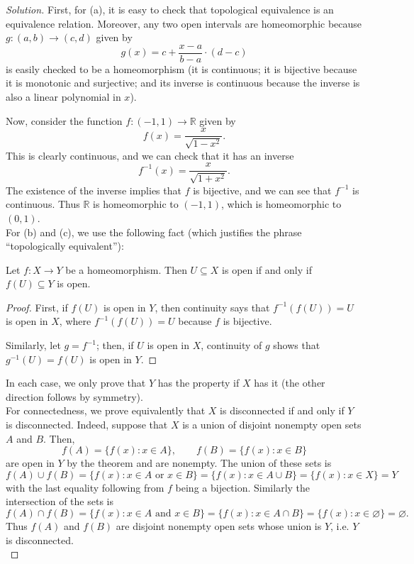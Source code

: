 \documentclass[11pt]{scrartcl}
\providecommand{\RR}{\mathbb R}
\providecommand{\inv}{^{-1}}
\newenvironment{soln}{\begin{proof}[Solution]}{\end{proof}}
\begin{document}
\begin{soln}
	First, for (a), it is easy to check that
	topological equivalence is an equivalence relation.
	Moreover, any two open intervals are homeomorphic because
	$g\colon (a, b)\to (c, d)$ given by
	\[g(x) = c + \frac{x-a}{b-a}\cdot (d-c)\]
	is easily checked to be a homeomorphism
	(it is continuous; it is bijective because it is monotonic and surjective;
	and its inverse is continuous because the inverse is also
	a linear polynomial in $x$).
	
	Now, consider the function $f\colon(-1,1)\to\RR$ given by 
	\[f(x) = \frac{x}{\sqrt{1 - x^2}}.\]
	This is clearly continuous, and we can check that
	it has an inverse
	\[f\inv(x) = \frac{x}{\sqrt{1 + x^2}}.\]
	The existence of the inverse implies that
	$f$ is bijective, and we can see that $f\inv$ is continuous.
	Thus $\RR$ is homeomorphic to $(-1,1)$, which is homeomorphic to $(0,1)$.\\
	
	For (b) and (c), we use the following fact
	(which justifies the phrase ``topologically equivalent''):
	\begin{theorem*}
		Let $f\colon X\to Y$ be a homeomorphism.
		Then $U\subseteq X$ is open if and only if $f(U)\subseteq Y$ is open.
	\end{theorem*}
	\begin{proof}
		First, if $f(U)$ is open in $Y$, then continuity says that
		$f\inv(f(U)) = U$ is open in $X$,
		where $f\inv(f(U)) = U$ because $f$ is bijective.
		
		Similarly, let $g = f\inv$; then, if $U$ is open in $X$,
		continuity of $g$ shows that $g\inv(U) = f(U)$ is open in $Y$.
	\end{proof}
	
	In each case, we only prove that
	$Y$ has the property if $X$ has it
	(the other direction follows by symmetry).\\
	
	For connectedness, we prove equivalently that
	$X$ is disconnected if and only if $Y$ is disconnected.
	Indeed, suppose that $X$ is a union of disjoint nonempty open sets
	$A$ and $B$. Then,
	\[f(A) = \{ f(x) : x\in A\},\qquad f(B) = \{f(x) : x\in B\}\]
	are open in $Y$ by the theorem and are nonempty.
	The union of these sets is
	\[f(A)\cup f(B) = \{f(x) : x\in A\text{ or }x\in B\}
	= \{f(x) : x\in A\cup B\} = \{f(x) : x\in X\} = Y\]
	with the last equality following from $f$ being a bijection.
	Similarly the intersection of the sets is
	\[f(A)\cap f(B) = \{f(x) : x\in A\text{ and }x\in B\}
	= \{f(x) : x\in A\cap B\} = \{f(x) : x\in\varnothing\}
	= \varnothing.\]
	Thus $f(A)$ and $f(B)$ are disjoint nonempty open sets
	whose union is $Y$, i.e. $Y$ is disconnected.\\
	

\end{soln}
\end{document}
